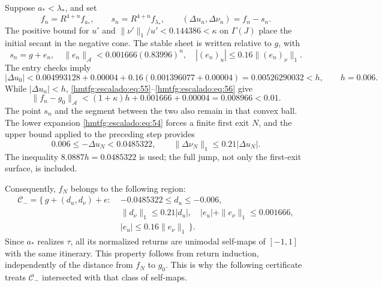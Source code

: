 Suppose \(a_*<\lambda_*\), and set
\[
f_n=R^{4+n}f_{a_*},\qquad
s_n=R^{4+n}f_{\lambda_*},\qquad
(\Delta u_n,\Delta\nu_n)=f_n-s_n.
\]
The positive bound for \(u'\) and \(\|\nu'\|_1/u'<0.144386<\kappa\) on \(\Gamma(J)\) place the initial secant in the negative cone. The stable sheet is written relative to \(g\), with
\begin{equation}
s_n=g+e_n,\quad
\|e_n\|_{\mathcal A}<0.001666(0.83996)^n,\quad
|(e_n)_u|\le0.16\|(e_n)_\nu\|_1.
\label{hmtfg:escalado:eq:56}
\end{equation}
The entry checks imply
\begin{equation}
|\Delta u_0|
<0.004993128+0.00004
 +0.16(0.001396077+0.00004)
=0.00526290032< h,\qquad h=0.006.
\label{hmtfg:escalado:eq:57}
\end{equation}
While \(|\Delta u_n|<h\), \eqref{hmtfg:escalado:eq:55}–\eqref{hmtfg:escalado:eq:56} give
\begin{equation}
\|f_n-g_0\|_{\mathcal A}
<(1+\kappa)h+0.001666+0.00004
=0.008966<0.01.
\label{hmtfg:escalado:eq:58}
\end{equation}
The point \(s_n\) and the segment between the two also remain in that convex ball. The lower expansion \eqref{hmtfg:escalado:eq:54} forces a finite first exit \(N\), and the upper bound applied to the preceding step provides
\begin{equation}
0.006\le-\Delta u_N<0.0485322,\qquad
\|\Delta\nu_N\|_1\le0.21|\Delta u_N|.
\label{hmtfg:escalado:eq:59}
\end{equation}
The inequality \(8.0887h=0.0485322\) is used; the full jump, not only the first-exit surface, is included.

Consequently, \(f_N\) belongs to the following region:
\begin{equation}
\begin{split}
\mathcal C_-=\{\,g+(d_u,d_\nu)+e:\;&
-0.0485322\le d_u\le-0.006,\\
&\|d_\nu\|_1\le0.21|d_u|,\quad
|e_u|+\|e_\nu\|_1\le0.001666,\\
&|e_u|\le0.16\|e_\nu\|_1\,\}.
\end{split}
\label{hmtfg:escalado:eq:60}
\end{equation}
Since \(a_*\) realizes \(\tau\), all its normalized returns are unimodal self-maps of \([-1,1]\) with the same itinerary. This property follows from return induction, independently of the distance from \(f_N\) to \(g_0\). This is why the following certificate treats \(\mathcal C_-\) intersected with that class of self-maps.

